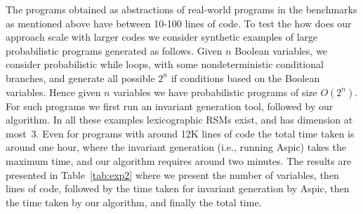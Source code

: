\smallskip{} 
The programs obtained as abstractions of real-world programs in the benchmarks 
as mentioned above have between 10-100 lines of code. 
To test the how does our approach scale with larger codes we consider synthetic examples 
of large probabilistic programs generated as follows.
Given $n$ Boolean variables, we consider probabilistic while loops,
with some nondeterministic conditional branches, and generate all possible $2^n$ if conditions
based on the Boolean variables. 
Hence given $n$ variables we have probabilistic programs of size $O(2^n)$.
For such programs we first run an invariant generation tool, followed by our algorithm.
In all these examples lexicographic RSMs exist, and has dimension at most~3.
Even for programs with around 12K lines of code the total time taken is around 
one hour, where the invariant generation (i.e., running Aspic) takes the maximum time, 
and our algorithm requires around two minutes.
The results are presented in Table~\ref{tab:exp2} where we present the number of 
variables, then lines of code, followed by the time taken for invariant generation
by Aspic, then the time taken by our algorithm, and finally the total time.






